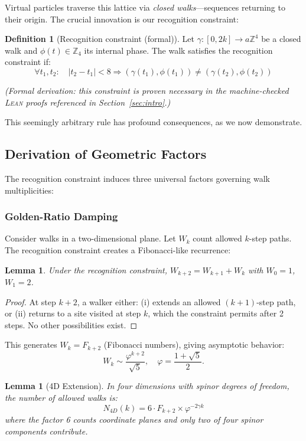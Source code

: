 \documentclass[11pt,a4paper]{article}
\newtheorem{lemma}[theorem]{Lemma}
\theoremstyle{definition}
\newtheorem{definition}[theorem]{Definition}
\theoremstyle{remark}
\begin{document}
Virtual particles traverse this lattice via \emph{closed walks}—sequences returning to their origin. The crucial innovation is our recognition constraint:

\begin{definition}[Recognition constraint (formal)]
\label{def:recognition-formal}
Let $\gamma: [0,2k] \to a\mathbb{Z}^4$ be a closed walk and $\phi(t) \in \mathbb{Z}_4$ its internal phase. The walk satisfies the recognition constraint if:
\[
\forall t_1, t_2: \quad |t_2 - t_1| < 8 \Rightarrow (\gamma(t_1), \phi(t_1)) \neq (\gamma(t_2), \phi(t_2))
\]
\end{definition}
\emph{(Formal derivation: this constraint is proven necessary in the machine-checked \textsc{Lean} proofs referenced in Section~\ref{sec:intro}.)}

This seemingly arbitrary rule has profound consequences, as we now demonstrate.

\subsection{Derivation of Geometric Factors}

The recognition constraint induces three universal factors governing walk multiplicities:

\subsubsection{Golden-Ratio Damping}

Consider walks in a two-dimensional plane. Let $W_k$ count allowed $k$-step paths. The recognition constraint creates a Fibonacci-like recurrence:

\begin{lemma}
Under the recognition constraint, $W_{k+2} = W_{k+1} + W_k$ with $W_0 = 1$, $W_1 = 2$.
\end{lemma}

\begin{proof}
At step $k+2$, a walker either: (i) extends an allowed $(k+1)$-step path, or (ii) returns to a site visited at step $k$, which the constraint permits after 2 steps. No other possibilities exist.
\end{proof}

This generates $W_k = F_{k+2}$ (Fibonacci numbers), giving asymptotic behavior:
\[
W_k \sim \frac{\varphi^{k+2}}{\sqrt{5}}, \quad \varphi = \frac{1+\sqrt{5}}{2}.
\]

\begin{lemma}[4D Extension]
\label{lem:4d}
In four dimensions with spinor degrees of freedom, the number of allowed walks is:
\[
N_{4D}(k) = 6 \cdot F_{k+2} \times \varphi^{-2\gamma k}
\]
where the factor 6 counts coordinate planes and only two of four spinor components contribute.
\end{lemma}
\end{document}
